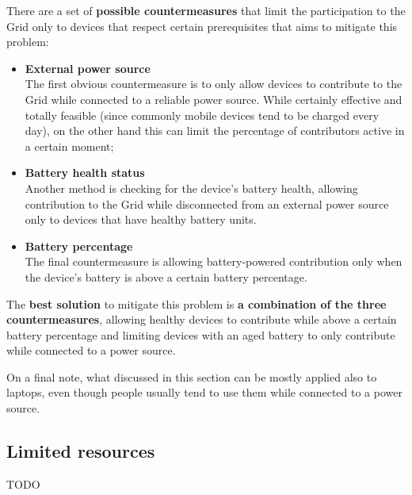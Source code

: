 There are a set of \textbf{possible countermeasures} that limit the participation to the Grid only to devices that respect certain prerequisites that aims to mitigate this problem:
\begin{itemize}
    \item \textbf{External power source}\\
    The first obvious countermeasure is to only allow devices to contribute to the Grid while connected to a reliable power source. While certainly effective and totally feasible (since commonly mobile devices tend to be charged every day), on the other hand this can limit the percentage of contributors active in a certain moment;
    \item \textbf{Battery health status}\\
    Another method is checking for the device's battery health, allowing contribution to the Grid while disconnected from an external power source only to devices that have healthy battery units.
    \item \textbf{Battery percentage}\\
    The final countermeasure is allowing battery-powered contribution only when the device's battery is above a certain battery percentage.
\end{itemize}
The \textbf{best solution} to mitigate this problem is \textbf{a combination of the three countermeasures}, allowing healthy devices to contribute while above a certain battery percentage and limiting devices with an aged battery to only contribute while connected to a power source.

On a final note, what discussed in this section can be mostly applied also to laptops, even though people usually tend to use them while connected to a power source.

\subsection{Limited resources}
TODO

